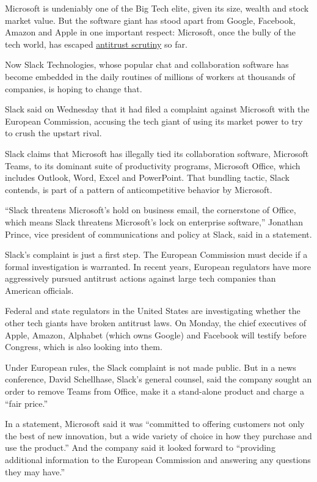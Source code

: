 Microsoft is undeniably one of the Big Tech elite, given its size,
wealth and stock market value. But the software giant has stood apart
from Google, Facebook, Amazon and Apple in one important respect:
Microsoft, once the bully of the tech world, has escaped
\href{https://www.nytimes.com/2018/05/05/world/europe/margrethe-vestager-silicon-valley-data-privacy.html}{antitrust
scrutiny} so far.

Now Slack Technologies, whose popular chat and collaboration software
has become embedded in the daily routines of millions of workers at
thousands of companies, is hoping to change that.

Slack said on Wednesday that it had filed a complaint against Microsoft
with the European Commission, accusing the tech giant of using its
market power to try to crush the upstart rival.

Slack claims that Microsoft has illegally tied its collaboration
software, Microsoft Teams, to its dominant suite of productivity
programs, Microsoft Office, which includes Outlook, Word, Excel and
PowerPoint. That bundling tactic, Slack contends, is part of a pattern
of anticompetitive behavior by Microsoft.

``Slack threatens Microsoft's hold on business email, the cornerstone of
Office, which means Slack threatens Microsoft's lock on enterprise
software,'' Jonathan Prince, vice president of communications and policy
at Slack, said in a statement.

Slack's complaint is just a first step. The European Commission must
decide if a formal investigation is warranted. In recent years, European
regulators have more aggressively pursued antitrust actions against
large tech companies than American officials.

Federal and state regulators in the United States are investigating
whether the other tech giants have broken antitrust laws. On Monday, the
chief executives of Apple, Amazon, Alphabet (which owns Google) and
Facebook will testify before Congress, which is also looking into them.

Under European rules, the Slack complaint is not made public. But in a
news conference, David Schellhase, Slack's general counsel, said the
company sought an order to remove Teams from Office, make it a
stand-alone product and charge a ``fair price.''

In a statement, Microsoft said it was ``committed to offering customers
not only the best of new innovation, but a wide variety of choice in how
they purchase and use the product.'' And the company said it looked
forward to ``providing additional information to the European Commission
and answering any questions they may have.''

